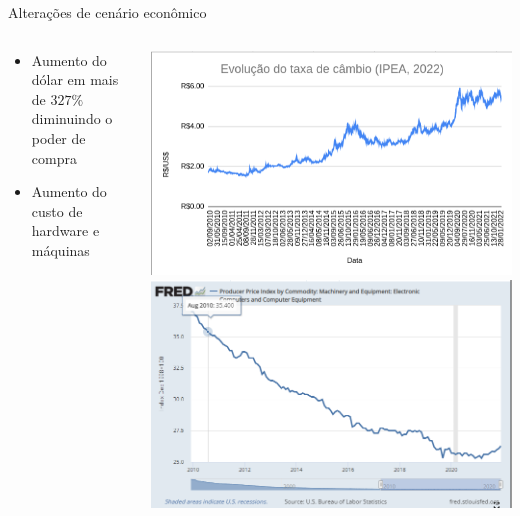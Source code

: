 \documentclass[10pt,brazil]{beamer}
\theoremstyle{definition}
\begin{document}
\begin{frame}{Alterações de cenário econômico}
  \begin{columns}
    \begin{column}{0.5\textwidth}
      \begin{itemize}
            \item Aumento do dólar em mais de $327\%$ diminuindo o poder de compra
            \item Aumento do custo de hardware e máquinas
      \end{itemize}
    \end{column}
    \begin{column}{0.5\textwidth}  %
      \begin{center}
        \includegraphics[width=1\textwidth]{variacaodolar.png}        \includegraphics[width=1\textwidth]{hardwarecost.png}
      \end{center}
    \end{column}
  \end{columns}
\end{frame}
\end{document}
